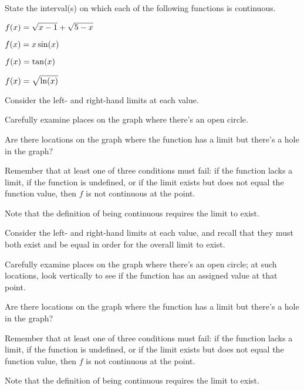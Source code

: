 \begin{activity} \label{A:1.3.2}
State the interval(s) on which each of the following functions is continuous.
\bmtwo
\ba
\item $\displaystyle f(x) = \sqrt{x-1} + \sqrt{5-x}$
\item $\displaystyle f(x) = x\sin(x)$
\item $\displaystyle f(x) = \tan(x)$
\item $\displaystyle f(x) = \sqrt{\ln(x)}$
\ea
\emtwo
\end{activity}
\begin{smallhint}
\ba
	\item Consider the left- and right-hand limits at each value.
	\item Carefully examine places on the graph where there's an open circle.
	\item Are there locations on the graph where the function has a limit but there's a hole in the graph?
	\item Remember that at least one of three conditions must fail: if the function lacks a limit, if the function is undefined, or if the limit exists but does not equal the function value, then $f$ is not continuous at the point.
	\item Note that the definition of being continuous requires the limit to exist.
\ea
\end{smallhint}
\begin{bighint}
\ba
	\item Consider the left- and right-hand limits at each value, and recall that they must both exist and be equal in order for the overall limit to exist.
	\item Carefully examine places on the graph where there's an open circle; at such locations, look vertically to see if the function has an assigned value at that point.
	\item Are there locations on the graph where the function has a limit but there's a hole in the graph?
	\item Remember that at least one of three conditions must fail: if the function lacks a limit, if the function is undefined, or if the limit exists but does not equal the function value, then $f$ is not continuous at the point.
	\item Note that the definition of being continuous requires the limit to exist.
\ea
\end{bighint}
